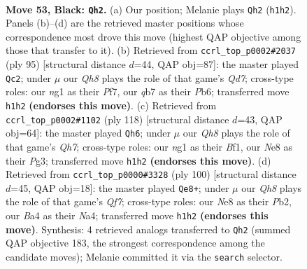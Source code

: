 \documentclass[11pt]{article}
\begin{document}
\clearpage

\begin{figure}[p]\centering
\begin{subfigure}{0.46\textwidth}\centering
\resizebox{\linewidth}{!}{%
\newchessgame
\chessboard[
  setfen={4n1k1/1Q6/p3P3/3P1p1p/b5p1/N7/5P2/5KNq b - - 2 53},
  showmover=false,
  pgfstyle=straightmove, color=movearrow, markmove={h1-h2}
]}
\caption{}
\end{subfigure}\hfill
\begin{subfigure}{0.46\textwidth}\centering
\resizebox{\linewidth}{!}{%
\newchessgame
\chessboard[
  setfen={4Qnk1/5p2/1p2p2p/8/P7/4P2P/3qNKP1/8 b - - 13 48},
  showmover=false,
  pgfstyle=straightmove, color=movearrow, markmove={d2-c2}
]}
\caption{}
\end{subfigure}
\\[4pt]
\begin{subfigure}{0.46\textwidth}\centering
\resizebox{\linewidth}{!}{%
\newchessgame
\chessboard[
  setfen={8/5knQ/6p1/2p4p/2P1p2P/6P1/5P2/3q1BK1 w - - 4 60},
  showmover=false,
  pgfstyle=straightmove, color=movearrow, markmove={h7-h6}
]}
\caption{}
\end{subfigure}\hfill
\begin{subfigure}{0.46\textwidth}\centering
\resizebox{\linewidth}{!}{%
\newchessgame
\chessboard[
  setfen={2k5/5Q2/2p2p2/7p/N2n1q1P/8/PP3PK1/8 w - - 2 51},
  showmover=false,
  pgfstyle=straightmove, color=movearrow, markmove={f7-e8}
]}
\caption{}
\end{subfigure}
\caption{\textbf{Move 53, Black: \texttt{Qh2}.} (a) Our position; Melanie plays \texttt{Qh2} (\texttt{h1h2}). Panels (b)--(d) are the retrieved master positions whose correspondence most drove this move (highest QAP objective among those that transfer to it). (b) Retrieved from \texttt{ccrl\_top\_p0002\#2037} (ply 95) [structural distance $d$=44, QAP obj=87]: the master played \texttt{Qc2}; under $\mu$ our \emph{Qh8} plays the role of that game's \emph{Qd7}; cross-type roles: our \emph{n}g1 as their \emph{P}f7, our \emph{q}b7 as their \emph{P}b6; transferred move \texttt{h1h2} \textbf{(endorses this move)}. (c) Retrieved from \texttt{ccrl\_top\_p0002\#1102} (ply 118) [structural distance $d$=43, QAP obj=64]: the master played \texttt{Qh6}; under $\mu$ our \emph{Qh8} plays the role of that game's \emph{Qh7}; cross-type roles: our \emph{n}g1 as their \emph{B}f1, our \emph{N}e8 as their \emph{P}g3; transferred move \texttt{h1h2} \textbf{(endorses this move)}. (d) Retrieved from \texttt{ccrl\_top\_p0000\#3328} (ply 100) [structural distance $d$=45, QAP obj=18]: the master played \texttt{Qe8+}; under $\mu$ our \emph{Qh8} plays the role of that game's \emph{Qf7}; cross-type roles: our \emph{N}e8 as their \emph{P}b2, our \emph{B}a4 as their \emph{N}a4; transferred move \texttt{h1h2} \textbf{(endorses this move)}. Synthesis: 4 retrieved analogs transferred to \texttt{Qh2} (summed QAP objective 183, the strongest correspondence among the candidate moves); Melanie committed it via the \texttt{search} selector.}
\label{fig:thought-m105}
\end{figure}
\end{document}
